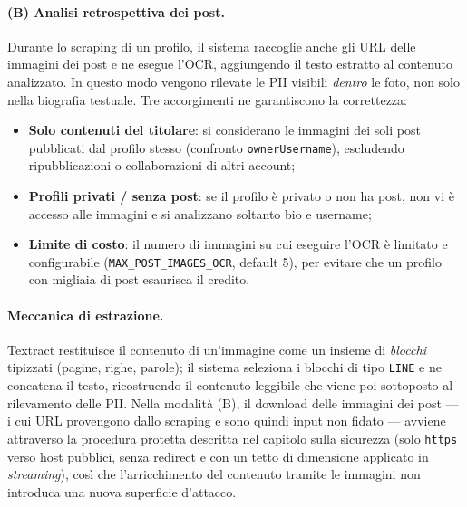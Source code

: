 \documentclass[11pt,a4paper]{article}
\begin{document}
\paragraph{(B) Analisi retrospettiva dei post.} Durante lo scraping di un profilo, il
sistema raccoglie anche gli URL delle immagini dei post e ne esegue l'OCR, aggiungendo
il testo estratto al contenuto analizzato. In questo modo vengono rilevate le PII
visibili \emph{dentro} le foto, non solo nella biografia testuale. Tre accorgimenti
ne garantiscono la correttezza:
\begin{itemize}[nosep]
  \item \textbf{Solo contenuti del titolare}: si considerano le immagini dei soli post
        pubblicati dal profilo stesso (confronto \texttt{ownerUsername}), escludendo
        ripubblicazioni o collaborazioni di altri account;
  \item \textbf{Profili privati / senza post}: se il profilo è privato o non ha post,
        non vi è accesso alle immagini e si analizzano soltanto bio e username;
  \item \textbf{Limite di costo}: il numero di immagini su cui eseguire l'OCR è
        limitato e configurabile (\texttt{MAX\_POST\_IMAGES\_OCR}, default 5), per
        evitare che un profilo con migliaia di post esaurisca il credito.
\end{itemize}

\paragraph{Meccanica di estrazione.} Textract restituisce il contenuto di un'immagine
come un insieme di \emph{blocchi} tipizzati (pagine, righe, parole); il sistema
seleziona i blocchi di tipo \texttt{LINE} e ne concatena il testo, ricostruendo il
contenuto leggibile che viene poi sottoposto al rilevamento delle PII. Nella modalità
(B), il download delle immagini dei post --- i cui URL provengono dallo scraping e sono
quindi input non fidato --- avviene attraverso la procedura protetta descritta nel
capitolo sulla sicurezza (solo \texttt{https} verso host pubblici, senza redirect e con
un tetto di dimensione applicato in \emph{streaming}), così che l'arricchimento del
contenuto tramite le immagini non introduca una nuova superficie d'attacco.
\end{document}
